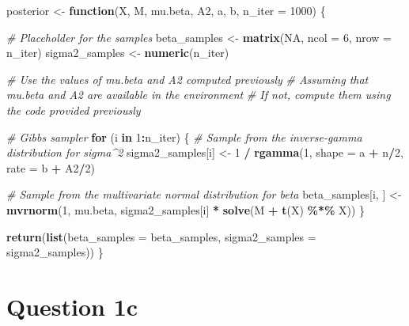 \documentclass[
]{article}
\newenvironment{Shaded}{\begin{snugshade}}{\end{snugshade}}
\newcommand{\AttributeTok}[1]{\textcolor[rgb]{0.13,0.29,0.53}{#1}}
\newcommand{\CommentTok}[1]{\textcolor[rgb]{0.56,0.35,0.01}{\textit{#1}}}
\newcommand{\ConstantTok}[1]{\textcolor[rgb]{0.56,0.35,0.01}{#1}}
\newcommand{\ControlFlowTok}[1]{\textcolor[rgb]{0.13,0.29,0.53}{\textbf{#1}}}
\newcommand{\DecValTok}[1]{\textcolor[rgb]{0.00,0.00,0.81}{#1}}
\newcommand{\FunctionTok}[1]{\textcolor[rgb]{0.13,0.29,0.53}{\textbf{#1}}}
\newcommand{\NormalTok}[1]{#1}
\newcommand{\OtherTok}[1]{\textcolor[rgb]{0.56,0.35,0.01}{#1}}
\newcommand{\SpecialCharTok}[1]{\textcolor[rgb]{0.81,0.36,0.00}{\textbf{#1}}}
\begin{document}
\begin{Shaded}
\begin{Highlighting}[]
\NormalTok{posterior }\OtherTok{\textless{}{-}} \ControlFlowTok{function}\NormalTok{(X, M, mu.beta, A2, a, b, }\AttributeTok{n\_iter =} \DecValTok{1000}\NormalTok{) \{}
 
  \CommentTok{\# Placeholder for the samples}
\NormalTok{  beta\_samples }\OtherTok{\textless{}{-}} \FunctionTok{matrix}\NormalTok{(}\ConstantTok{NA}\NormalTok{, }\AttributeTok{ncol =} \DecValTok{6}\NormalTok{, }\AttributeTok{nrow =}\NormalTok{ n\_iter)}
\NormalTok{  sigma2\_samples }\OtherTok{\textless{}{-}} \FunctionTok{numeric}\NormalTok{(n\_iter)}
  
  \CommentTok{\# Use the values of mu.beta and A2 computed previously}
  \CommentTok{\# Assuming that mu.beta and A2 are available in the environment}
  \CommentTok{\# If not, compute them using the code provided previously}
  
  \CommentTok{\# Gibbs sampler}
  \ControlFlowTok{for}\NormalTok{ (i }\ControlFlowTok{in} \DecValTok{1}\SpecialCharTok{:}\NormalTok{n\_iter) \{}
    \CommentTok{\# Sample from the inverse{-}gamma distribution for sigma\^{}2}
\NormalTok{    sigma2\_samples[i] }\OtherTok{\textless{}{-}} \DecValTok{1} \SpecialCharTok{/} \FunctionTok{rgamma}\NormalTok{(}\DecValTok{1}\NormalTok{, }\AttributeTok{shape =}\NormalTok{ a }\SpecialCharTok{+}\NormalTok{ n}\SpecialCharTok{/}\DecValTok{2}\NormalTok{, }\AttributeTok{rate =}\NormalTok{ b }\SpecialCharTok{+}\NormalTok{ A2}\SpecialCharTok{/}\DecValTok{2}\NormalTok{)}
    
    \CommentTok{\# Sample from the multivariate normal distribution for beta}
\NormalTok{    beta\_samples[i, ] }\OtherTok{\textless{}{-}} \FunctionTok{mvrnorm}\NormalTok{(}\DecValTok{1}\NormalTok{, mu.beta, sigma2\_samples[i] }\SpecialCharTok{*} \FunctionTok{solve}\NormalTok{(M }\SpecialCharTok{+} \FunctionTok{t}\NormalTok{(X) }\SpecialCharTok{\%*\%}\NormalTok{ X))}
\NormalTok{  \}}

  \FunctionTok{return}\NormalTok{(}\FunctionTok{list}\NormalTok{(}\AttributeTok{beta\_samples =}\NormalTok{ beta\_samples, }\AttributeTok{sigma2\_samples =}\NormalTok{ sigma2\_samples))}
\NormalTok{\}}
\end{Highlighting}
\end{Shaded}

\hypertarget{question-1c}{%
\section{Question 1c}\label{question-1c}}
\end{document}

